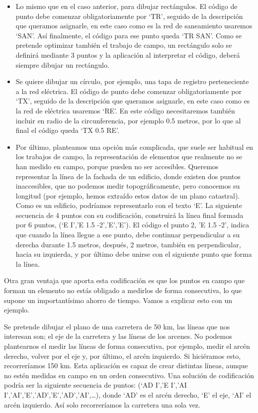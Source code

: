 \begin{itemize}
\item Lo mismo que en el caso anterior, para dibujar rectángulos. El código de punto debe comenzar obligatoriamente por ‘TR’, seguido de la descripción que queramos asignarle, en este caso como es la red de saneamiento usaremos ‘SAN’. Así finalmente, el código para ese punto queda ‘TR SAN’. Como se pretende optimizar también el trabajo de campo, un rectángulo solo se definirá mediante 3 puntos y la aplicación al interpretar el código, deberá siempre dibujar un rectángulo.

\item Se quiere dibujar un círculo, por ejemplo, una tapa de registro perteneciente a la red eléctrica.  El código de punto debe comenzar obligatoriamente por ‘TX’, seguido de la descripción que queramos asignarle, en este caso como es la red de eléctrica usaremos ‘RE’. En este código necesitaremos también incluir en radio de la circunferencia, por ejemplo 0.5 metros, por lo que al final el código queda ‘TX 0.5 RE’.

\item Por último, planteamos una opción más complicada, que suele ser habitual en los trabajos de campo, la representación de elementos que realmente no se han medido en campo, porque pueden no ser accesibles. Queremos representar la línea de la fachada de un edificio, donde existen dos puntos inaccesibles, que no podemos medir topográficamente, pero conocemos su longitud (por ejemplo, hemos extraído estos datos de un plano catastral). Como es un edificio, podríamos representarlo con el texto ‘E’. La siguiente secuencia de 4 puntos con su codificación, construirá la línea final formada por 6 puntos, (‘E I’,’E 1.5 -2’,’E’,’E’). El código el punto 2, ’E 1.5 -2’, indica que cuando la línea llegue a ese punto, debe continuar perpendicular a su derecha durante 1.5 metros, después, 2 metros, también en perpendicular, hacia su izquierda, y por último debe unirse con el siguiente punto que forma la línea. 

\end{itemize}

Otra gran ventaja que aporta esta codificación es que los puntos en campo que forman un elemento no estás obligado a medirlos de forma consecutiva, lo que supone un importantísimo ahorro de tiempo. Vamos a explicar esto con un ejemplo.

Se pretende dibujar el plano de una carretera de 50 km, las líneas que nos interesan son; el eje de la carretera y las líneas de los arcenes. No podemos plantearnos el medir las líneas de forma consecutiva, por ejemplo, medir el arcén derecho, volver por el eje y, por último, el arcén izquierdo. Si hiciéramos esto, recorreríamos 150 km. Esta aplicación es capaz de crear distintas líneas, aunque no estén medidas en campo en un orden consecutivo. Una solución de codificación podría ser la siguiente secuencia de puntos: (‘AD I’,’E I’,’AI I’,’AI’,’E’,’AD’,’E’,’AD’,’AI’,…), donde ‘AD’ es el arcén derecho, ‘E’ el eje, ‘AI’ el arcén izquierdo. Así solo recorreríamos la carretera una sola vez. 

